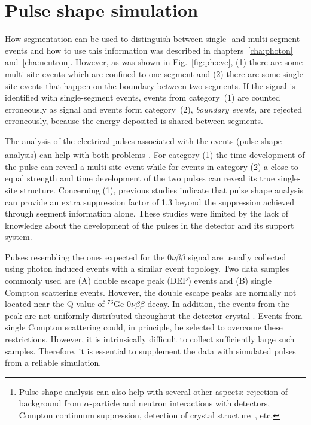 \chapter{Pulse shape simulation}
\label{cha:pss}
How segmentation can be used to distinguish between single- and
multi-segment events and how to use this information was described in
chapters~\ref{cha:photon} and~\ref{cha:neutron}.  However, as was
shown in Fig.~\ref{fig:ph:eve}, (1) there are some multi-site events
which are confined to one segment and (2) there are some single-site
events that happen on the boundary between two segments. If the
signal is identified with single-segment events, events from
category~(1) are counted erroneously as signal and events form
category~(2), \textit{boundary events}, are rejected erroneously,
because the energy deposited is shared between segments.

The analysis of the electrical pulses associated with the events
(pulse shape analysis) can help with both problems\footnote{Pulse
shape analysis can also help with several other aspects: rejection of
background from $\alpha$-particle and neutron interactions with
detectors, Compton continuum suppression\cite{comcon}, detection of
crystal structure~\cite{agata}, etc.}. For category (1) the time
development of the pulse can reveal a multi-site event while for
events in category (2) a close to equal strength and time development
of the two pulses can reveal its true single-site structure.
Concerning (1), previous studies \cite{Kev07} indicate that pulse
shape analysis can provide an extra suppression factor of 1.3 beyond
the suppression achieved through segment information alone. These
studies were limited by the lack of knowledge about the development of
the pulses in the detector and its support system.

Pulses resembling the ones expected for the $0\nu\beta\beta$ signal
are usually collected using photon induced events with a similar event
topology. Two data samples commonly used are (A) double escape peak
(DEP) events and (B) single Compton scattering
events\cite{scoms}. However, the double escape peaks are normally not
located near the Q-value of $^{76}$Ge $0\nu\beta\beta$ decay. In
addition, the events from the peak are not uniformly distributed
throughout the detector crystal \cite{major}.  Events from single
Compton scattering could, in principle, be selected to overcome these
restrictions. However, it is intrinsically difficult to collect
sufficiently large such samples.  Therefore, it is essential to
supplement the data with simulated pulses from a reliable simulation.

